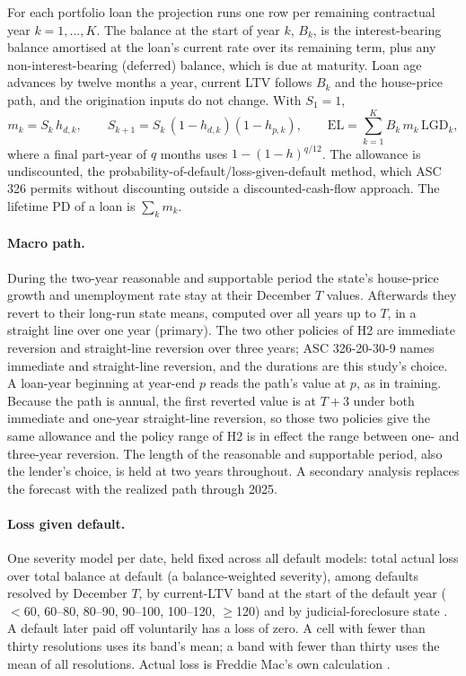 For each portfolio loan the projection runs one row per remaining contractual
year $k=1,\dots,K$. The balance at the start of year $k$, $B_k$, is the
interest-bearing balance amortised at the loan's current rate over its
remaining term, plus any non-interest-bearing (deferred) balance, which is due
at maturity. Loan age advances by twelve months a year, current LTV follows
$B_k$ and the house-price path, and the origination inputs do not change.
With $S_1=1$,
\begin{equation}\label{eq:el}
m_k = S_k\,h_{d,k},\qquad S_{k+1}=S_k\,(1-h_{d,k})(1-h_{p,k}),\qquad
\mathrm{EL} = \sum_{k=1}^{K} B_k\, m_k\, \mathrm{LGD}_k ,
\end{equation}
where a final part-year of $q$ months uses $1-(1-h)^{q/12}$. The allowance is
undiscounted, the probability-of-default/loss-given-default method, which ASC
326 permits without discounting outside a discounted-cash-flow approach. The
lifetime PD of a loan is $\sum_k m_k$.

\paragraph{Macro path.} During the two-year reasonable and supportable period
the state's house-price growth and unemployment rate stay at their December $T$
values. Afterwards they revert to their long-run state means, computed over
all years up to $T$, in a straight line over one year (primary). The two
other policies of H2 are immediate reversion and straight-line reversion over
three years; ASC 326-20-30-9 names immediate and straight-line reversion, and
the durations are this study's choice. A loan-year beginning at year-end $p$
reads the path's value at $p$, as in training. Because the path is annual, the
first reverted value is at $T+3$ under both immediate and one-year
straight-line reversion, so those two policies give the same allowance and the
policy range of H2 is in effect the range between one- and three-year
reversion. The length of the reasonable and supportable period, also the
lender's choice, is held at two years throughout. A secondary
analysis replaces the forecast with the realized path through 2025.

\paragraph{Loss given default.} One severity model per date, held fixed across
all default models: total actual loss over total balance at default (a
balance-weighted severity), among defaults resolved by December $T$, by current-LTV band at the start of the
default year ($<$60, 60--80, 80--90, 90--100, 100--120, $\ge$120) and by
judicial-foreclosure state \citep{gerardi2013borrower}. A default
later paid off voluntarily has a loss of zero. A cell with fewer than thirty
resolutions uses its band's mean; a band with fewer than thirty uses the mean
of all resolutions. Actual loss is Freddie Mac's own calculation
\citep{FreddieGuide2026}.

